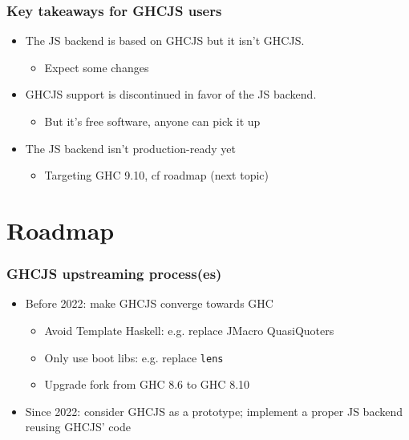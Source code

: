 \documentclass{beamer}
\begin{document}
\begin{frame}
\frametitle{Key takeaways for GHCJS users}
\begin{itemize}
\item The JS backend is based on GHCJS but it isn’t GHCJS.
  \begin{itemize}
    \item Expect some changes
  \end{itemize}
\item GHCJS support is discontinued in favor of the JS backend.
\begin{itemize}
\item But it’s free software, anyone can pick it up
\end{itemize}
\item The JS backend isn't production-ready yet
\begin{itemize}
  \item Targeting GHC 9.10, cf roadmap (next topic)
\end{itemize}
\end{itemize}
\end{frame}

\section{Roadmap}

\begin{frame}
\frametitle{GHCJS upstreaming process(es)}

\begin{itemize}
\item Before 2022: make GHCJS converge towards GHC
\begin{itemize}
\item Avoid Template Haskell: e.g. replace JMacro QuasiQuoters
\item Only use boot libs: e.g. replace \texttt{lens}
\item Upgrade fork from GHC 8.6 to GHC 8.10
\end{itemize}

\item Since 2022: consider GHCJS as a prototype; implement a proper JS backend reusing GHCJS’ code
\end{itemize}
\end{frame}
\end{document}
